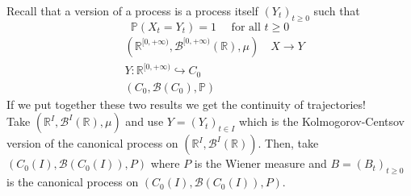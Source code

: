 Recall that a version of a process is a process itself $(Y_t)_{t \geq 0}$ such that 
\begin{equation*}
    \mathbb{P}(X_t = Y_t) = 1 \quad \text{ for all } t \geq 0
\end{equation*}
\begin{equation*}
    \begin{split}
        & (\mathbb{R}^{[0, +\infty)}, \mathcal{B}^{[0,+\infty)}(\mathbb{R}), \mu) \quad X \rightarrow Y \\
        & Y: \mathbb{R}^{[0,+\infty)} \hookrightarrow C_0 \\
        & (C_0, \mathcal{B}(C_0), \mathbb{P})
    \end{split}
\end{equation*}
If we put together these two results we get the continuity of trajectories! \\
Take $(\mathbb{R}^I, \mathcal{B}^I(\mathbb{R}), \mu)$ and use $Y=(Y_t)_{t \in I}$ which is the Kolmogorov-Centsov version of the canonical process on $(\mathbb{R}^I, \mathcal{B}^I(\mathbb{R}))$. Then, take $(C_0(I), \mathcal{B}(C_0(I)), P)$ where $P$ is the Wiener measure and $B = (B_t)_{t \geq 0}$ is the canonical process on $(C_0(I), \mathcal{B}(C_0(I)), P)$. 

